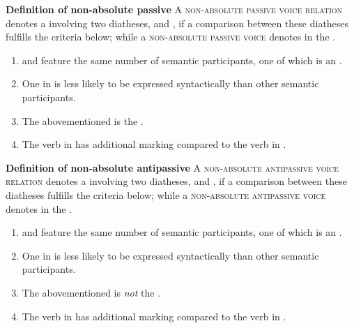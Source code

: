 \eanoraggedright
		\textbf{Definition of non-absolute passive} \newline
		A \textsc{non-absolute passive voice relation} denotes a  involving two diatheses,  and , if a comparison between these diatheses fulfills the criteria below; while a \textsc{non-absolute passive voice} denotes  in the .
		\begin{enumerate}[label=\roman*)]
			\item {} and  feature the same number of semantic participants, one of which is an .
			\item One  in  is less likely to be expressed syntactically than other semantic participants.
			\item The abovementioned  is the .
			\item The verb in  has additional marking compared to the verb in .
		\end{enumerate}
\z

\eanoraggedright
		\textbf{Definition of non-absolute antipassive} \newline
		A \textsc{non-absolute antipassive voice relation} denotes a  involving two diatheses,  and , if a comparison between these diatheses fulfills the criteria below; while a \textsc{non-absolute antipassive voice} denotes  in the .
		\begin{enumerate}[label=\roman*)]
			\item {} and  feature the same number of semantic participants, one of which is an .
			\item One  in  is less likely to be expressed syntactically than other semantic participants.
			\item The abovementioned  is \textit{not} the .
			\item The verb in  has additional marking compared to the verb in .
                \end{enumerate}
\z

